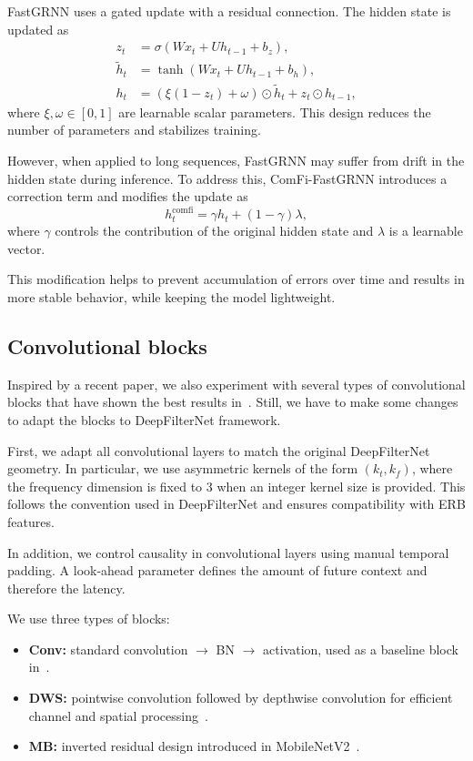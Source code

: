 \documentclass[a4paper,12pt]{extarticle}
\begin{document}
FastGRNN uses a gated update with a residual connection. The hidden state is updated as
\begin{align}
z_t &= \sigma(Wx_t + Uh_{t-1} + b_z), \\
\tilde{h}_t &= \tanh(Wx_t + Uh_{t-1} + b_h), \\
h_t &= (\xi(1 - z_t) + \omega)\odot \tilde{h}_t + z_t \odot h_{t-1},
\end{align}
where $\xi, \omega \in [0, 1]$ are learnable scalar parameters. This design reduces the number of parameters
and stabilizes training.

However, when applied to long sequences, FastGRNN may suffer from drift in the hidden state during inference.
To address this, ComFi-FastGRNN introduces a correction term and modifies the update as
\begin{equation}
h_t^{\text{comfi}} = \gamma h_t + (1 - \gamma)\lambda,
\end{equation}
where $\gamma$ controls the contribution of the original hidden state and $\lambda$ is a learnable vector.

This modification helps to prevent accumulation of errors over time and results in more stable behavior,
while keeping the model lightweight.

\subsection{Convolutional blocks}

Inspired by a recent paper, we also experiment with several types of convolutional blocks that have shown the best results in~\cite{ulunas}.
Still, we have to make some changes to adapt the blocks to DeepFilterNet framework.

First, we adapt all convolutional layers to match the original DeepFilterNet geometry. In particular, we use asymmetric kernels of the form 
$(k_t,k_f)$, where the frequency dimension is fixed to $3$ when an integer kernel size is provided. This follows the convention used 
in DeepFilterNet and ensures compatibility with ERB features.

In addition, we control causality in convolutional layers using manual temporal padding. A look-ahead parameter defines the amount
of future context and therefore the latency.

We use three types of blocks:
\begin{itemize}
    \item \textbf{Conv:} standard convolution $\to$ BN $\to$ activation, used as a baseline block in~\cite{ulunas}.
    \item \textbf{DWS:} pointwise convolution followed by depthwise convolution for efficient channel and spatial processing~\cite{mobilenets}.
    \item \textbf{MB:} inverted residual design introduced in MobileNetV2~\cite{mobilenetv2}.
\end{itemize}
\end{document}
